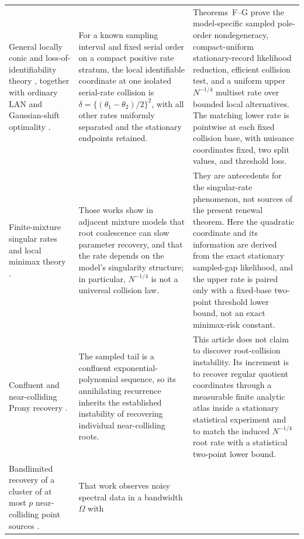 \begin{longtable}{>{\raggedright\arraybackslash}p{}
>{\raggedright\arraybackslash}p{}
>{\raggedright\arraybackslash}p{}}
\addlinespace
General locally conic and loss-of-identifiability theory
\cite{DacunhaCastelleGassiat1997LocallyConic,
LiuShao2003LossIdentifiability}, together with ordinary LAN and Gaussian-shift
optimality \cite{vanDerVaart1998AsymptoticStatistics}. &
For a known sampling interval and fixed serial order on a compact positive
rate stratum, the local identifiable coordinate at one isolated serial-rate
collision is \(\delta=\{(\theta_1-\theta_2)/2\}^2\), with all other rates
uniformly separated and the stationary endpoints retained. &
Theorems~F--G prove the model-specific sampled pole-order nondegeneracy,
compact-uniform stationary-record likelihood reduction, efficient collision
test, and a uniform upper \(N^{-1/4}\) multiset rate over bounded local
alternatives.  The matching lower rate is pointwise at each fixed collision
base, with nuisance coordinates fixed, two split values, and threshold loss. \\
\addlinespace
Finite-mixture singular rates and local minimax theory
\cite{Chen1995FiniteMixtureRate,HoNguyen2019SingularityStructures,
HeinrichKahn2018FiniteMixtureMinimax}. &
Those works show in adjacent mixture models that root coalescence can slow
parameter recovery, and that the rate depends on the model's singularity
structure; in particular, \(N^{-1/4}\) is not a universal collision law. &
They are antecedents for the singular-rate phenomenon, not sources of the
present renewal theorem.  Here the quadratic coordinate and its information
are derived from the exact stationary sampled-gap likelihood, and the upper
rate is paired only with a fixed-base two-point threshold lower bound, not an
exact minimax-risk constant. \\
\addlinespace
Confluent and near-colliding Prony recovery
\cite{BatenkovYomdin2013ConfluentProny,
AkinshinGoldmanYomdin2021NearCollidingProny}. &
The sampled tail is a confluent exponential-polynomial sequence, so its
annihilating recurrence inherits the established instability of recovering
individual near-colliding roots. &
This article does not claim to discover root-collision instability.  Its
increment is to recover regular quotient coordinates through a measurable
finite analytic atlas inside a stationary statistical experiment and to match
the induced \(N^{-1/4}\) root rate with a statistical two-point lower bound. \\
\addlinespace
Bandlimited recovery of a cluster of at most \(p\) near-colliding point
sources \cite{BatenkovGoldmanYomdin2021SuperResolution}. &
That work observes noisy spectral data in a bandwidth \(\Omega\) with

\end{longtable}
